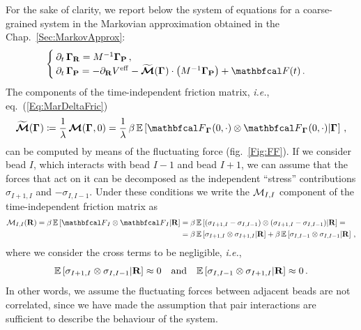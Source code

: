 \documentclass[10pt,a4paper]{book}
\theoremstyle{definition}
\begin{document}
For the sake of clarity, we report below the system of equations for a coarse-grained system in the Markovian approximation obtained in the Chap.~\ref{Sec:MarkovApprox}:
\begin{equation}
\label{Eq:MarkovApproxCompact}
\begin{cases}
 \partial_t\,\Bphase{\bfR} = M^{-1}\Bphase{\bfP} \,, & \\
 \partial_t\,\Bphase{\bfP} = -\partial_{\bfR}\Veff 
                             - \widetilde{\bffricmat}(\Bphase{})\cdot \cip{M^{-1}\Bphase{\bfP}}
                             + \fprojbf(t) \,. &  
\end{cases}
\end{equation}
The components of the time-independent friction matrix, \textit{i.e.}, eq.~(\ref{Eq:MarDeltaFric}) 
\[
  \widetilde{\bffricmat}(\Bphase{}) \coloneqq \frac{1}{\lambda}\,\bffricmat(\Bphase{},0) =  
  \frac{1}{\lambda}\, \beta\, \cexpval{ \fprojbf_{\Bphase{}}(0,\cdot) \otimes \fprojbf_{\Bphase{}}(0,\cdot) }{ \Bphase{} }\,,
\]
can be computed by means of the fluctuating force (fig.~\ref{Fig:FF}).
If we consider bead $I$, which interacts with bead $I-1$ and bead $I+1$, we can assume that the forces that act on it can be decomposed as the independent ``stress'' contributions $\sigma_{I+1,I}$ and $-\sigma_{I,I-1}$. Under these conditions we write the $\mathcal{M}_{I,I}$ component of the time-independent friction matrix as
\begin{align*}
  \fricmat_{I,I}(\bfR) = \beta\,\cexpval{\fprojbf_I \otimes \fprojbf_I}{\bfR} &=
           \beta\,\cexpval{ (\sigma_{I+1,I}-\sigma_{I,I-1}) \otimes (\sigma_{I+1,I}-\sigma_{I,I-1}) }{\bfR} = \\
  &= \beta\,\cexpval{ \sigma_{I+1,I} \otimes \sigma_{I+1,I} }{\bfR} + \beta\,\cexpval{ \sigma_{I,I-1} \otimes \sigma_{I,I-1} }{\bfR} \,,
\end{align*}
where we consider the cross terms to be negligible, \textit{i.e.},
\[
 \mathbb{E}\left[ { \sigma_{I+1,I} \otimes \sigma_{I,I-1} } \middle\vert {\mathbf{R}} \right]\approx 0 \quad\text{and}\quad \mathbb{E}\left[ { \sigma_{I,I-1} \otimes \sigma_{I+1,I}} \middle\vert {\mathbf{R}} \right]\approx 0\,.
\]
In other words, we assume the fluctuating forces between adjacent beads are not correlated, since we have made the assumption that pair interactions are sufficient to describe the behaviour of the system.
\end{document}
